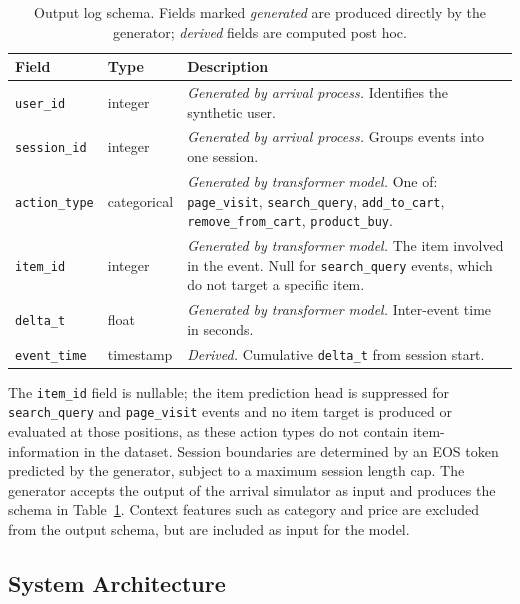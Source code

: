 \documentclass[sigconf,nonacm]{acmart}
\begin{document}
\begin{table}[H]
\caption{Output log schema. Fields marked \emph{generated} are produced
  directly by the generator; \emph{derived} fields are computed post hoc.}
\label{tab:schema}
\small
\begin{tabularx}{\columnwidth}{@{}l l X@{}}
\toprule
Field & Type & Description \\
\midrule
\texttt{user\_id}     & integer     & \textit{Generated by arrival process.} Identifies the synthetic user. \\
\texttt{session\_id}  & integer     & \textit{Generated by arrival process.} Groups events into one session. \\
\texttt{action\_type} & categorical & \textit{Generated by transformer model.} One of: \texttt{page\_visit},
                                     \texttt{search\_query}, \texttt{add\_to\_cart},
                                     \texttt{remove\_from\_cart}, \texttt{product\_buy}. \\
\texttt{item\_id} & integer & \textit{Generated by transformer model.} The item involved in the event.
  Null for \texttt{search\_query} events, which do not target a specific item. \\
\texttt{delta\_t}     & float       & \textit{Generated by transformer model.} Inter-event time in seconds. \\
\texttt{event\_time}  & timestamp   & \textit{Derived.} Cumulative \texttt{delta\_t} from
                                     session start. \\
\bottomrule
\end{tabularx}
\end{table}

The \texttt{item\_id} field is nullable; the item prediction head is
suppressed for \texttt{search\_query} and \texttt{page\_visit} events and no item target is produced
or evaluated at those positions, as these action types do not contain item-information in the dataset. Session boundaries are determined by an EOS
token predicted by the generator, subject to a maximum session length cap.
The generator accepts the output of the arrival simulator as input and
produces the schema in Table~\ref{tab:schema}. Context features such as
category and price are excluded from the output schema, but are included as input for the model.

\subsection{System Architecture}
\label{sec:system-arch}
\end{document}
